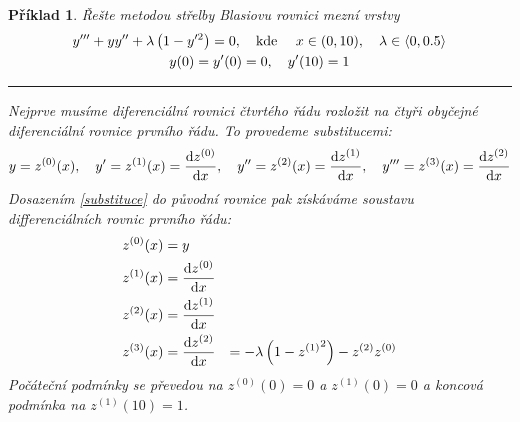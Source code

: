 \documentclass{article}
\newtheorem{example}{Příklad}
\begin{document}
\setcounter{example}{27}
\begin{example}
    Řešte metodou střelby Blasiovu rovnici mezní vrstvy
    \begin{gather*}
        y''' + y y'' + \lambda \left( 1 - y'^{2} \right)  = 0,  \qq{kde } x \in (0,10) \qcomma \lambda \in \langle 0, 0.5 \rangle \\
        y(0) = y'(0) = 0 \qcomma y'(10) = 1
    \end{gather*}
    \smallskip
    \hrule
    \medskip
    Nejprve musíme diferenciální rovnici čtvrtého řádu rozložit na čtyři obyčejné diferenciální rovnice prvního řádu. To provedeme substitucemi:
    \begin{equation}
        \label{substituce}
        y = z^{(0)}(x) \qcomma
        y' = z^{(1)}(x) = \dv{z^{(0)}}{x} \qcomma
        y'' = z^{(2)}(x) = \dv{z^{(1)}}{x} \qcomma
        y''' = z^{(3)}(x) = \dv{z^{(2)}}{x}
    \end{equation}
    Dosazením \ref{substituce} do původní rovnice pak získáváme soustavu differenciálních rovnic prvního řádu:
    \begin{equation}
        \begin{aligned}
           z^{(0)}(x) &= y \\
           z^{(1)}(x) &= \dv{z^{(0)}}{x} \\
           z^{(2)}(x) &= \dv{z^{(1)}}{x} \\
           z^{(3)}(x) &= \dv{z^{(2)}}{x}(x) &= -\lambda \left( 1 - {z^{(1)}}^{2} \right)  - z^{(2)}z^{(0)}
        \end{aligned}
    \end{equation}
    Počáteční podmínky se převedou na $z^{(0)}(0) = 0$ a $z^{(1)}(0) = 0$ a koncová podmínka na $z^{(1)}(10) = 1$.
    

\end{example}
\end{document}
